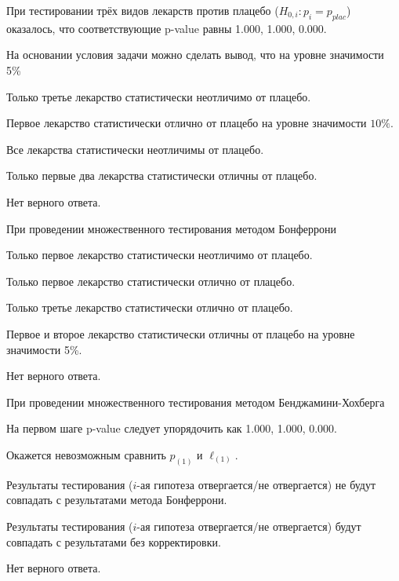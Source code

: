 \documentclass[10pt, a4paper]{exam}
\begin{document}
	При тестировании трёх видов лекарств против плацебо ($H_{0,i}: p_i = p_{plac}$) оказалось, что соответствующие p-value равны 1.000, 1.000, 0.000.
	
	\begin{questions}
		\question На основании условия задачи можно сделать вывод, что на уровне значимости 5\%
		\begin{choices}
			\item Только третье лекарство статистически неотличимо от плацебо.
			\item Первое лекарство статистически отлично от плацебо на уровне значимости $10\%$.
			\item Все лекарства статистически неотличимы от плацебо.
			\item Только первые два лекарства статистически отличны от плацебо.
			\item Нет верного ответа.
		\end{choices}
	
		\question При проведении множественного тестирования методом Бонферрони
		\begin{choices}
			\item Только первое лекарство статистически неотличимо от плацебо.
			\item Только первое лекарство статистически отлично от плацебо.
			\item Только третье лекарство статистически отлично от плацебо.
			\item Первое и второе лекарство статистически отличны от плацебо на уровне значимости 5\%.
			\item Нет верного ответа.
		\end{choices}
	
		\question При проведении множественного тестирования методом Бенджамини-Хохберга
		\begin{choices}
			\item На первом шаге p-value следует упорядочить как 1.000, 1.000, 0.000.
			\item Окажется невозможным сравнить $p_{(1)}$ и $\ell_{(1)}$.
			\item Результаты тестирования ($i$-ая гипотеза отвергается/не отвергается) не будут совпадать с результатами метода Бонферрони.  
			\item Результаты тестирования ($i$-ая гипотеза отвергается/не отвергается) будут совпадать с результатами без корректировки.  
			\item Нет верного ответа.
		\end{choices}
	

\end{questions}
\end{document}
